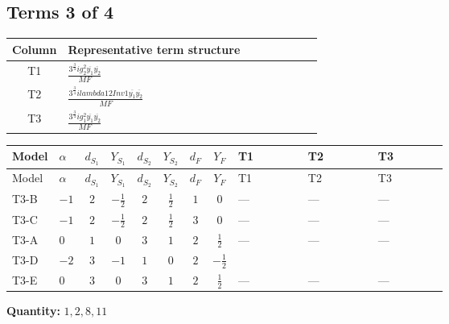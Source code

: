 \documentclass[8pt]{article}
\begin{document}
\begin{landscape}
\subsection*{Terms 3 of 4}
\begin{center}
\begin{tabular}{@{}c >{\raggedright\arraybackslash}p{0.82\linewidth}@{}}
\toprule
Column & Representative term structure \\
\midrule
T1 & \(\displaystyle \frac{3^{\frac{3}{4}} i g_{2}^{2} \overline{y_{1}} \overline{y_{2}}}{MF}\) \\
\midrule
T2 & \(\displaystyle \frac{3^{\frac{3}{4}} i lambda12Inv1 \overline{y_{1}} \overline{y_{2}}}{MF}\) \\
\midrule
T3 & \(\displaystyle \frac{3^{\frac{3}{4}} i g_{1}^{2} \overline{y_{1}} \overline{y_{2}}}{MF}\) \\
\midrule
\bottomrule
\end{tabular}
\end{center}
\smallskip
\tiny
\begin{longtable}{@{}llcccccc >{\raggedright\arraybackslash}p{0.21\linewidth} >{\raggedright\arraybackslash}p{0.21\linewidth} >{\raggedright\arraybackslash}p{0.21\linewidth}@{}}
\toprule
Model & $\alpha$ & $d_{S_1}$ & $Y_{S_1}$ & $d_{S_2}$ & $Y_{S_2}$ & $d_F$ & $Y_F$ & T1 & T2 & T3 \\
\midrule
\endfirsthead
\toprule
Model & $\alpha$ & $d_{S_1}$ & $Y_{S_1}$ & $d_{S_2}$ & $Y_{S_2}$ & $d_F$ & $Y_F$ & T1 & T2 & T3 \\
\midrule
\endhead
T3-B & $-1$ & $2$ & $-\frac{1}{2}$ & $2$ & $\frac{1}{2}$ & $1$ & $0$ & --- & --- & --- \\
\midrule
T3-C & $-1$ & $2$ & $-\frac{1}{2}$ & $2$ & $\frac{1}{2}$ & $3$ & $0$ & --- & --- & --- \\
\midrule
T3-A & $0$ & $1$ & $0$ & $3$ & $1$ & $2$ & $\frac{1}{2}$ & --- & --- & --- \\
\midrule
T3-D & $-2$ & $3$ & $-1$ & $1$ & $0$ & $2$ & $-\frac{1}{2}$ & \scriptsize\adjustbox{max width=\linewidth}{$\begin{gathered} - \frac{25 \cdot 3^{\frac{3}{4}} i g_{2}^{2} \overline{y_{1}} \overline{y_{2}}}{24 MF}\end{gathered}$} & \scriptsize\adjustbox{max width=\linewidth}{$\begin{gathered} - \frac{3^{\frac{3}{4}} i lambda12Inv1 \overline{y_{1}} \overline{y_{2}}}{6 MF}\end{gathered}$} & \scriptsize\adjustbox{max width=\linewidth}{$\begin{gathered} - \frac{3^{\frac{3}{4}} i g_{1}^{2} \overline{y_{1}} \overline{y_{2}}}{8 MF}\end{gathered}$} \\
\midrule
T3-E & $0$ & $3$ & $0$ & $3$ & $1$ & $2$ & $\frac{1}{2}$ & --- & --- & --- \\
\midrule
\bottomrule
\end{longtable}
\clearpage
\noindent\textbf{Quantity: }$\mathrm{1,2,8,11}$\par\smallskip

\end{landscape}
\end{document}
